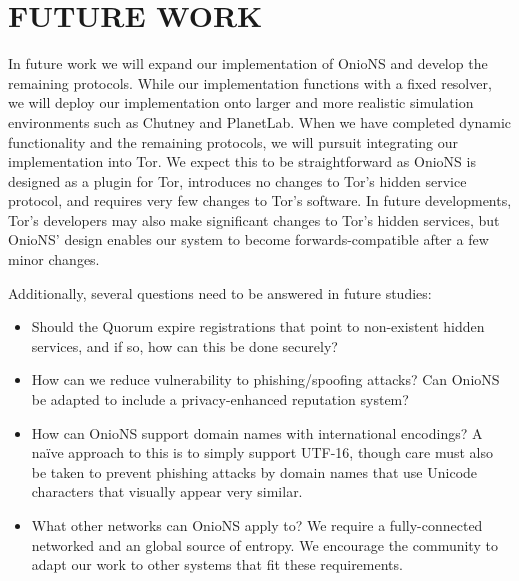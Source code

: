 
\chapter{FUTURE WORK}

\vspace{24pt}

In future work we will expand our implementation of OnioNS and develop the remaining protocols. While our implementation functions with a fixed resolver, we will deploy our implementation onto larger and more realistic simulation environments such as Chutney and PlanetLab. When we have completed dynamic functionality and the remaining protocols, we will pursuit integrating our implementation into Tor. We expect this to be straightforward as OnioNS is designed as a plugin for Tor, introduces no changes to Tor's hidden service protocol, and requires very few changes to Tor's software. In future developments, Tor's developers may also make significant changes to Tor's hidden services, but OnioNS' design enables our system to become forwards-compatible after a few minor changes.

Additionally, several questions need to be answered in future studies:

\begin{itemize}
	\item Should the Quorum expire registrations that point to non-existent hidden services, and if so, how can this be done securely?
	\item How can we reduce vulnerability to phishing/spoofing attacks? Can OnioNS be adapted to include a privacy-enhanced reputation system?
	\item How can OnioNS support domain names with international encodings? A na\"{i}ve approach to this is to simply support UTF-16, though care must also be taken to prevent phishing attacks by domain names that use Unicode characters that visually appear very similar.
	\item What other networks can OnioNS apply to? We require a fully-connected networked and an global source of entropy. We encourage the community to adapt our work to other systems that fit these requirements.
\end{itemize}